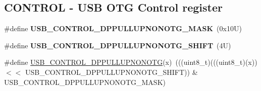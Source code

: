 \subsection*{C\+O\+N\+T\+R\+OL -\/ U\+SB O\+TG Control register}
\begin{DoxyCompactItemize}
\item 
\mbox{\label{group___u_s_b___register___masks_ga764d9d972859eeded5e092a77eb4de79}} 
\#define {\bfseries U\+S\+B\+\_\+\+C\+O\+N\+T\+R\+O\+L\+\_\+\+D\+P\+P\+U\+L\+L\+U\+P\+N\+O\+N\+O\+T\+G\+\_\+\+M\+A\+SK}~(0x10\+U)
\item 
\mbox{\label{group___u_s_b___register___masks_ga5bae9683a5ae7c48617b8d24a35786ce}} 
\#define {\bfseries U\+S\+B\+\_\+\+C\+O\+N\+T\+R\+O\+L\+\_\+\+D\+P\+P\+U\+L\+L\+U\+P\+N\+O\+N\+O\+T\+G\+\_\+\+S\+H\+I\+FT}~(4\+U)
\item 
\#define \mbox{\hyperlink{group___u_s_b___register___masks_gae22b0aee8222ab7dd6f06db5ab401558}{U\+S\+B\+\_\+\+C\+O\+N\+T\+R\+O\+L\+\_\+\+D\+P\+P\+U\+L\+L\+U\+P\+N\+O\+N\+O\+TG}}(x)~(((uint8\+\_\+t)(((uint8\+\_\+t)(x)) $<$$<$ U\+S\+B\+\_\+\+C\+O\+N\+T\+R\+O\+L\+\_\+\+D\+P\+P\+U\+L\+L\+U\+P\+N\+O\+N\+O\+T\+G\+\_\+\+S\+H\+I\+FT)) \& U\+S\+B\+\_\+\+C\+O\+N\+T\+R\+O\+L\+\_\+\+D\+P\+P\+U\+L\+L\+U\+P\+N\+O\+N\+O\+T\+G\+\_\+\+M\+A\+SK)
\end{DoxyCompactItemize}

